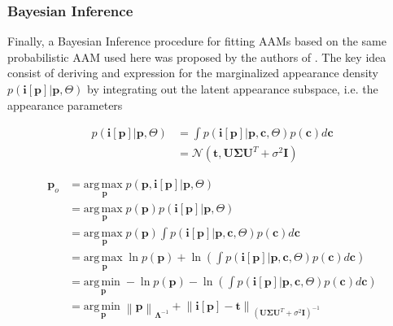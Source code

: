 \subsubsection{Bayesian Inference}

Finally, a Bayesian Inference procedure for fitting AAMs based on the same probabilistic AAM used here was proposed by the authors of \cite{}. The key idea consist of deriving and expression for the marginalized appearance density $p(\mathbf{i}[\mathbf{p}] | \mathbf{p}, \Theta)$ by integrating out the latent appearance subspace, i.e. the appearance parameters

\begin{align}
p(\mathbf{i}[\mathbf{p}] | \mathbf{p}, \Theta) & = \int p(\mathbf{i}[\mathbf{p}] | \mathbf{p}, \mathbf{c}, \Theta) p(\mathbf{c}) d \mathbf{c}
\\
& = \mathcal{N} \left( \mathbf{t}, \mathbf{U}\boldsymbol{\Sigma}\mathbf{U}^T + \sigma^2 \mathbf{I} \right)
\end{align}

\begin{align}
\mathbf{p}_o & = \underset{\mathbf{p}}{\mathrm{arg\,max\;}} 
p(\mathbf{p}, \mathbf{i}[\mathbf{p}] | \mathbf{p}, \Theta)
\\
& = \underset{\mathbf{p}}{\mathrm{arg\,max\;}} 
p(\mathbf{p}) p(\mathbf{i}[\mathbf{p}] | \mathbf{p}, \Theta)
\\
& = \underset{\mathbf{p}}{\mathrm{arg\,max\;}} 
p(\mathbf{p}) \int p(\mathbf{i}[\mathbf{p}] | \mathbf{p}, \mathbf{c}, \Theta) p(\mathbf{c}) d \mathbf{c}
\\
& = \underset{\mathbf{p}}{\mathrm{arg\,max\;}} 
\ln p(\mathbf{p}) + \ln \left( \int p(\mathbf{i}[\mathbf{p}] | \mathbf{p}, \mathbf{c}, \Theta) p(\mathbf{c}) d \mathbf{c} \right)
\\
& = \underset{\mathbf{p}}{\mathrm{arg\,min\;}} 
-\ln p(\mathbf{p}) - \ln \left( \int p(\mathbf{i}[\mathbf{p}] | \mathbf{p}, \mathbf{c}, \Theta) p(\mathbf{c}) d \mathbf{c} \right)
\\
& = \underset{\mathbf{p}}{\mathrm{arg\,min\;}} 
\left\| \mathbf{p} \right\|_{\boldsymbol{\Lambda}^{-1}} +
\left\| \mathbf{i}[\mathbf{p}] - \mathbf{t} \right\|_{\left( \mathbf{U}\boldsymbol{\Sigma}\mathbf{U}^T + \sigma^2 \mathbf{I} \right)^{-1}}
\end{align}


